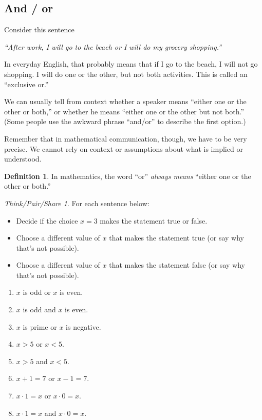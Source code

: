 \documentclass[10pt, reqno]{amsart}
\theoremstyle{remark}
\newtheorem*{thinkpair*}{Think/Pair/Share}
\theoremstyle{definition}
\newtheorem{define}[thm]{Definition}
\numberwithin{equation}{section}  %
\begin{document}
\subsection{And / or}
Consider this sentence 
\begin{center}
\emph{``After work, I will go to the beach or I will do my grocery shopping.''}
\end{center}
In everyday English, that probably means that if I go to the beach, I will not go shopping.  I will do one or the other, but not both activities.  This is called an ``exclusive or.''

We can usually tell from context whether a speaker means ``either one or the other or both,'' or whether he means ``either one or the other but not both.''  (Some people use the awkward phrase ``and/or'' to describe the first option.)  

Remember that in mathematical communication, though, we have to be very precise.  We cannot rely on context or assumptions about what is implied or understood.
\begin{define}
In mathematics, the word ``or'' \emph{always means} ``either one or the other or both.''
\end{define}

\begin{thinkpair*}
For each sentence below:
\begin{itemize}
\item
Decide if the choice $x = 3$ makes the statement true or false.  
\item
Choose a different value of $x$ that makes the statement true (or say why that's not possible).
\item
Choose a different value of $x$ that makes the statement false (or say why that's not possible).
\end{itemize}

\begin{enumerate}
\item
$x$ is odd or $x$ is even.
\item
$x$ is odd and $x$ is even.
\item
$x$ is prime or $x$ is negative.
\item
$x >5$ or $x < 5$.
\item
$x >5$ and $x < 5$.
\item
$x + 1 = 7$ or $x - 1 = 7$.
\item
$x \cdot 1 = x$ or $x \cdot 0 = x$.
\item
$x \cdot 1 = x$ and $x \cdot 0 = x$.
\end{enumerate}
\end{thinkpair*}
\end{document}
